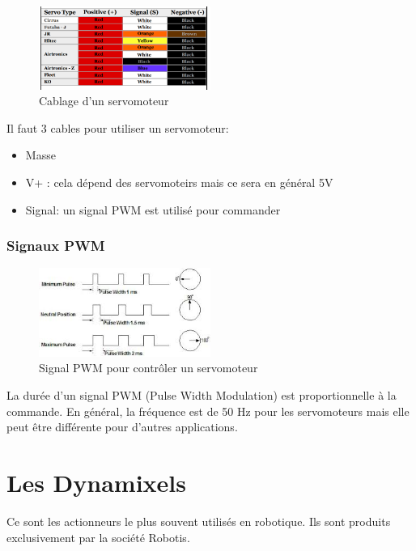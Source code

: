 \documentclass[a4paper, 11pt]{report}
\begin{document}
\begin{figure}[h!]
\begin{centering}
\includegraphics[width=0.5\textwidth]{images/colorCodeCableServo.png}
\caption{Cablage d'un servomoteur}
\par\end{centering}
\end{figure}

Il faut 3 cables pour utiliser un servomoteur:
\begin{itemize}
\item Masse
\item V+ : cela dépend des servomoteirs mais ce sera en général 5V
\item Signal: un signal PWM est utilisé pour commander 
\end{itemize}

\subsubsection{Signaux PWM}

\begin{figure}[h!]
\begin{centering}
\includegraphics[width=0.5\textwidth]{images/PWMservo.jpeg}
\caption{Signal PWM pour contrôler un servomoteur}
\par\end{centering}
\end{figure}

La durée d'un signal PWM (Pulse Width Modulation) est proportionnelle à la commande. En général, la fréquence est de 50 Hz pour les servomoteurs mais elle peut être différente pour d'autres applications.

\section{Les Dynamixels}
Ce sont les actionneurs le plus souvent utilisés en robotique. Ils sont produits exclusivement par la société Robotis.
\end{document}
